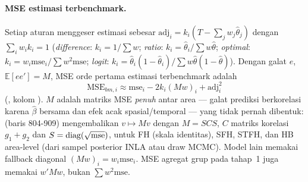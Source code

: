 \paragraph{MSE estimasi terbenchmark.} Setiap aturan menggeser estimasi sebesar
$\mathrm{adj}_i=k_i(T-\sum_jw_j\hat\theta_j)$ dengan $\sum_iw_ik_i=1$
(\emph{difference}: $k_i=1/\sum w$; \emph{ratio}: $k_i=\hat\theta_i/\sum
w\hat\theta$; \emph{optimal}: $k_i=w_i\mathrm{mse}_i/\sum w^2\mathrm{mse}$;
\emph{logit}: $k_i=\hat\theta_i(1-\hat\theta_i)/\sum w\hat\theta(1-\hat\theta)$).
Dengan galat $e$, $\mathbb E[ee']=M$, MSE orde pertama estimasi terbenchmark
adalah
\begin{equation}
  \mathrm{MSE}_{bm,i}\approx\mathrm{mse}_i-2k_i(Mw)_i+\mathrm{adj}_i^2
  \label{eq:bm-mse}
\end{equation}
(, kolom ). $M$ adalah
matriks MSE \emph{penuh} antar area --- galat prediksi berkorelasi karena
$\hat\beta$ bersama dan efek acak spasial/temporal --- yang tidak pernah
dibentuk:  (baris 804-909) mengembalikan $v\mapsto Mv$
dengan $M=SCS$, $C$ matriks korelasi $g_1+g_2$ dan $S=\operatorname{diag}(\sqrt{\mathrm{mse}})$,
untuk FH (skala identitas), SFH, STFH, dan HB area-level (dari sampel
posterior INLA atau draw MCMC). Model lain memakai fallback diagonal
$(Mw)_i=w_i\mathrm{mse}_i$. MSE agregat grup pada tahap~1 juga memakai
$w'Mw$, bukan $\sum w^2\mathrm{mse}$.

